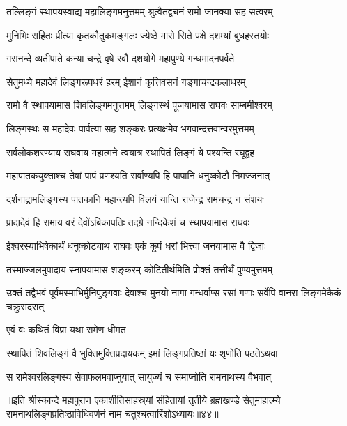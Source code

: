 \twolineshloka
{तल्लिङ्गं स्थापयस्वाद्य महालिङ्गमनुत्तमम्}
{श्रुत्वैतद्वचनं रामो जानक्या सह सत्वरम्}%

\twolineshloka
{मुनिभिः सहितः प्रीत्या कृतकौतुकमङ्गलः}
{ज्येष्ठे मासे सिते पक्षे दशम्यां बुधहस्तयोः}%

\twolineshloka
{गरानन्दे व्यतीपाते कन्या चन्द्रे वृषे रवौ}
{दशयोगे महापुण्ये गन्धमादनपर्वते}%

\twolineshloka
{सेतुमध्ये महादेवं लिङ्गरूपधरं हरम्}
{ईशानं कृत्तिवसनं गङ्गाचन्द्रकलाधरम्}%

\twolineshloka
{रामो वै स्थापयामास शिवलिङ्गमनुत्तमम्}
{लिङ्गस्थं पूजयामास राघवः साम्बमीश्वरम्}%

\twolineshloka
{लिङ्गस्थः स महादेवः पार्वत्या सह शङ्करः}
{प्रत्यक्षमेव भगवान्दत्तवान्वरमुत्तमम्}%

\twolineshloka
{सर्वलोकशरण्याय राघवाय महात्मने}
{त्वयात्र स्थापितं लिङ्गं ये पश्यन्ति रघूद्वह}%

\twolineshloka
{महापातकयुक्ताश्च तेषां पापं प्रणश्यति}
{सर्वाण्यपि हि पापानि धनुष्कोटौ निमज्जनात्}%

\twolineshloka
{दर्शनाद्रामलिङ्गस्य पातकानि महान्त्यपि}
{विलयं यान्ति राजेन्द्र रामचन्द्र न संशयः}%

\twolineshloka
{प्रादादेवं हि रामाय वरं देवोंऽबिकापतिः}
{तदग्रे नन्दिकेशं च स्थापयामास राघवः}%

\twolineshloka
{ईश्वरस्याभिषेकार्थं धनुष्कोट्याथ राघवः}
{एकं कूपं धरां भित्त्वा जनयामास वै द्विजाः}%

\twolineshloka
{तस्माज्जलमुपादाय स्नापयामास शङ्करम्}
{कोटितीर्थमिति प्रोक्तं तत्तीर्थं पुण्यमुत्तमम्}%

\threelineshloka
{उक्तं तद्वैभवं पूर्वमस्माभिर्मुनिपुङ्गवाः}
{देवाश्च मुनयो नागा गन्धर्वाप्स रसां गणाः}
{सर्वेपि वानरा लिङ्गमेकैकं चक्रुरादरात्}%



\onelineshloka
{एवं वः कथितं विप्रा यथा रामेण धीमत}%

\twolineshloka
{स्थापितं शिवलिङ्गं वै भुक्तिमुक्तिप्रदायकम्}
{इमां लिङ्गप्रतिष्ठां यः शृणोति पठतेऽथवा}%

\twolineshloka
{स रामेश्वरलिङ्गस्य सेवाफलमवाप्नुयात्}
{सायुज्यं च समाप्नोति रामनाथस्य वैभवात्}%

॥इति श्रीस्कान्दे महापुराण एकाशीतिसाहस्र्यां संहितायां तृतीये ब्रह्मखण्डे सेतुमाहात्म्ये रामनाथलिङ्गप्रतिष्ठाविधिवर्णनं नाम चतुश्चत्वारिंशोऽध्यायः॥४४॥


